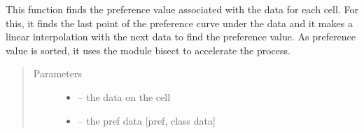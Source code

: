 \documentclass[letterpaper,10pt,english]{sphinxmanual}
\begin{document}

\begin{fulllineitems}
\label{\detokenize{index:src.calcul_hab.find_pref_value}}
This function finds the preference value associated with the data for each cell. For this, it finds the last
point of the preference curve under the data and it makes a linear interpolation with the next data to
find the preference value. As preference value is sorted, it uses the module bisect to accelerate the process.
\begin{quote}\begin{description}
\item[{Parameters}] \leavevmode\begin{itemize}
\item {} 
 -- the data on the cell

\item {} 
 -- the pref data {[}pref, class data{]}

\end{itemize}

\end{description}\end{quote}

\end{fulllineitems}

\end{document}

